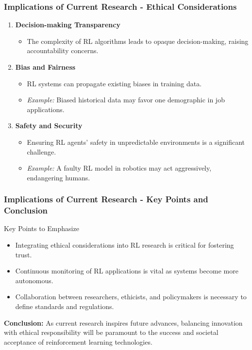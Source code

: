 \documentclass[aspectratio=169]{beamer}
\begin{document}
\begin{frame}[fragile]
  \frametitle{Implications of Current Research - Ethical Considerations}
  \begin{enumerate}
    \item \textbf{Decision-making Transparency}
    \begin{itemize}
      \item The complexity of RL algorithms leads to opaque decision-making, raising accountability concerns.
    \end{itemize}
    
    \item \textbf{Bias and Fairness}
    \begin{itemize}
      \item RL systems can propagate existing biases in training data.
      \item \textit{Example:} Biased historical data may favor one demographic in job applications.
    \end{itemize}
    
    \item \textbf{Safety and Security}
    \begin{itemize}
      \item Ensuring RL agents' safety in unpredictable environments is a significant challenge.
      \item \textit{Example:} A faulty RL model in robotics may act aggressively, endangering humans.
    \end{itemize}
  \end{enumerate}
\end{frame}

\begin{frame}[fragile]
  \frametitle{Implications of Current Research - Key Points and Conclusion}
  \begin{block}{Key Points to Emphasize}
    \begin{itemize}
      \item Integrating ethical considerations into RL research is critical for fostering trust.
      \item Continuous monitoring of RL applications is vital as systems become more autonomous.
      \item Collaboration between researchers, ethicists, and policymakers is necessary to define standards and regulations.
    \end{itemize}
  \end{block}
  
  \textbf{Conclusion:} As current research inspires future advances, balancing innovation with ethical responsibility will be paramount to the success and societal acceptance of reinforcement learning technologies.
\end{frame}
\end{document}

